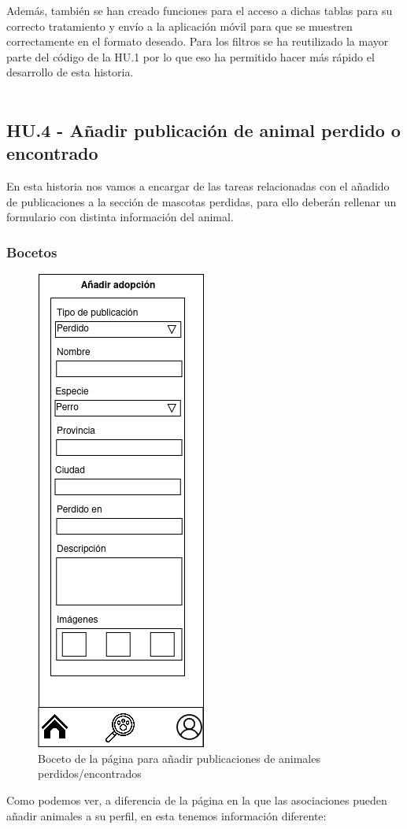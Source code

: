 Además, también se han creado funciones para el acceso a dichas tablas para su correcto tratamiento y envío a la aplicación móvil para que se muestren correctamente en el formato deseado. Para los filtros se ha reutilizado la mayor parte del código de la HU.1 por lo que eso ha permitido hacer más rápido el desarrollo de esta historia.\\ \\

\subsection{HU.4 - Añadir publicación de animal perdido o encontrado}

En esta historia nos vamos a encargar de las tareas relacionadas con el añadido de publicaciones a la sección de mascotas perdidas, para ello deberán rellenar un formulario con distinta información del animal. \\
\subsubsection{Bocetos}
\begin{figure}[H]
	\centering
	\includegraphics[width=0.25\linewidth]{"sprint 2/hu4/postearPerdido"}
	\caption{Boceto de la página para añadir publicaciones de animales perdidos/encontrados}
	\label{fig:postearperdido}
\end{figure}

Como podemos ver, a diferencia de la página en la que las asociaciones pueden añadir animales a su perfil, en esta tenemos información diferente:

